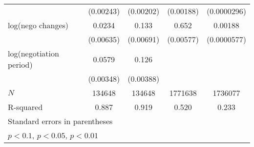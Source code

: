 {\begin{tabular}{l*{4}{c}}
            &   (0.00243)         &   (0.00202)         &   (0.00188)         & (0.0000296)         \\
\addlinespace
log(nego changes)&      0.0234\sym{***}&       0.133\sym{***}&       0.652\sym{***}&     0.00188\sym{***}\\
            &   (0.00635)         &   (0.00691)         &   (0.00577)         & (0.0000577)         \\
\addlinespace
log(negotiation period)&      0.0579\sym{***}&       0.126\sym{***}&                     &                     \\
            &   (0.00348)         &   (0.00388)         &                     &                     \\
\midrule
\(N\)       &      134648         &      134648         &     1771638         &     1736077         \\
R-squared   &       0.887         &       0.919         &       0.520         &       0.233         \\
\bottomrule
\multicolumn{5}{l}{\footnotesize Standard errors in parentheses}\\
\multicolumn{5}{l}{\footnotesize \sym{*} \(p<0.1\), \sym{**} \(p<0.05\), \sym{***} \(p<0.01\)}\\
\end{tabular}
}
